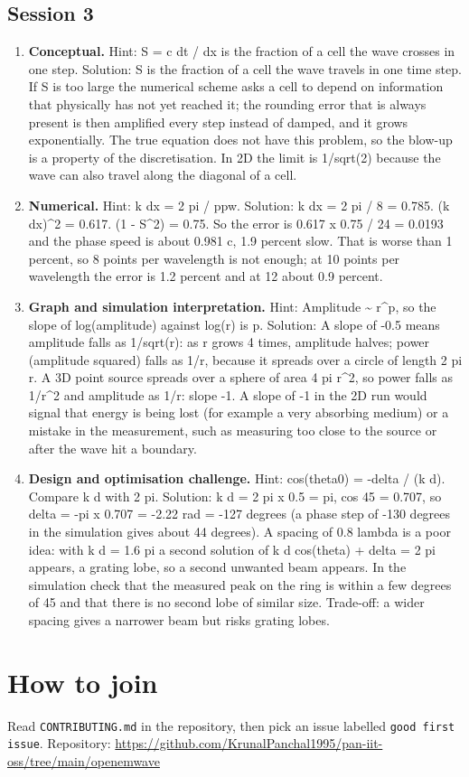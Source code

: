 \documentclass[11pt,a4paper]{article}
\begin{document}
\subsection*{Session 3}
\begin{enumerate}[nosep]
\item \textbf{Conceptual.} Hint: S = c dt / dx is the fraction of a cell the wave crosses in one step. Solution: S is the fraction of a cell the wave travels in one time step. If S is too large the numerical scheme asks a cell to depend on information that physically has not yet reached it; the rounding error that is always present is then amplified every step instead of damped, and it grows exponentially. The true equation does not have this problem, so the blow-up is a property of the discretisation. In 2D the limit is 1/sqrt(2) because the wave can also travel along the diagonal of a cell.
\item \textbf{Numerical.} Hint: k dx = 2 pi / ppw. Solution: k dx = 2 pi / 8 = 0.785. (k dx)\textasciicircum{}2 = 0.617. (1 - S\textasciicircum{}2) = 0.75. So the error is 0.617 x 0.75 / 24 = 0.0193 and the phase speed is about 0.981 c, 1.9 percent slow. That is worse than 1 percent, so 8 points per wavelength is not enough; at 10 points per wavelength the error is 1.2 percent and at 12 about 0.9 percent.
\item \textbf{Graph and simulation interpretation.} Hint: Amplitude \textasciitilde{} r\textasciicircum{}p, so the slope of log(amplitude) against log(r) is p. Solution: A slope of -0.5 means amplitude falls as 1/sqrt(r): as r grows 4 times, amplitude halves; power (amplitude squared) falls as 1/r, because it spreads over a circle of length 2 pi r. A 3D point source spreads over a sphere of area 4 pi r\textasciicircum{}2, so power falls as 1/r\textasciicircum{}2 and amplitude as 1/r: slope -1. A slope of -1 in the 2D run would signal that energy is being lost (for example a very absorbing medium) or a mistake in the measurement, such as measuring too close to the source or after the wave hit a boundary.
\item \textbf{Design and optimisation challenge.} Hint: cos(theta0) = -delta / (k d). Compare k d with 2 pi. Solution: k d = 2 pi x 0.5 = pi, cos 45 = 0.707, so delta = -pi x 0.707 = -2.22 rad = -127 degrees (a phase step of -130 degrees in the simulation gives about 44 degrees). A spacing of 0.8 lambda is a poor idea: with k d = 1.6 pi a second solution of k d cos(theta) + delta = 2 pi appears, a grating lobe, so a second unwanted beam appears. In the simulation check that the measured peak on the ring is within a few degrees of 45 and that there is no second lobe of similar size. Trade-off: a wider spacing gives a narrower beam but risks grating lobes.
\end{enumerate}

\section{How to join}
Read \texttt{CONTRIBUTING.md} in the repository, then pick an issue labelled \texttt{good first issue}. Repository: \url{https://github.com/KrunalPanchal1995/pan-iit-oss/tree/main/openemwave}
\end{document}
